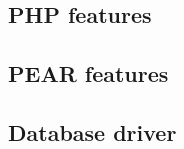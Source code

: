 \subsection[sec:package relationship namespaces php features]{PHP features}


\subsection[sec:package relationship namespaces pear packages]{PEAR features}


\subsection[sec:package relationship namespaces database drivers]{Database driver}

